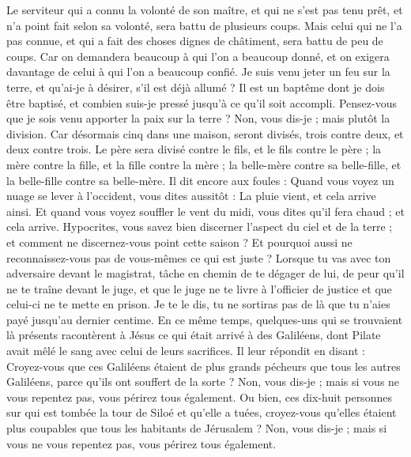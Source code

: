 \begin{multicols}{2}
Le serviteur qui a connu la volonté de son maître, et qui ne s'est pas tenu prêt, et n'a point fait selon sa volonté, sera battu de plusieurs coups.
Mais celui qui ne l'a pas connue, et qui a fait des choses dignes de châtiment, sera battu de peu de coups. Car on demandera beaucoup à qui l’on a beaucoup donné, et on exigera davantage de celui à qui l’on a beaucoup confié.
Je suis venu jeter un feu sur la terre, et qu’ai-je à désirer, s'il est déjà allumé ?
Il est un baptême dont je dois être baptisé, et combien suis-je pressé jusqu'à ce qu'il soit accompli.
Pensez-vous que je sois venu apporter la paix sur la terre ? Non, vous dis-je ; mais plutôt la division.
Car désormais cinq dans une maison, seront divisés, trois contre deux, et deux contre trois.
Le père sera divisé contre le fils, et le fils contre le père ; la mère contre la fille, et la fille contre la mère ; la belle-mère contre sa belle-fille, et la belle-fille contre sa belle-mère.
Il dit encore aux foules : Quand vous voyez un nuage se lever à l'occident, vous dites aussitôt : La pluie vient, et cela arrive ainsi.
Et quand vous voyez souffler le vent du midi, vous dites qu'il fera chaud ; et cela arrive.
Hypocrites, vous savez bien discerner l’aspect du ciel et de la terre ; et comment ne discernez-vous point cette saison ?
Et pourquoi aussi ne reconnaissez-vous pas de vous-mêmes ce qui est juste ?
Lorsque tu vas avec ton adversaire devant le magistrat, tâche en chemin de te dégager de lui, de peur qu’il ne te traîne devant le juge, et que le juge ne te livre à l’officier de justice et que celui-ci ne te mette en prison.
Je te le dis, tu ne sortiras pas de là que tu n’aies payé jusqu’au dernier centime.
\VerseOne{}En ce même temps, quelques-uns qui se trouvaient là présents racontèrent à Jésus ce qui était arrivé à des Galiléens, dont Pilate avait mêlé le sang avec celui de leurs sacrifices.
Il leur répondit en disant : Croyez-vous que ces Galiléens étaient de plus grands pécheurs que tous les autres Galiléens, parce qu'ils ont souffert de la sorte ?
Non, vous dis-je ; mais si vous ne vous repentez pas, vous périrez tous également.
Ou bien, ces dix-huit personnes sur qui est tombée la tour de Siloé et qu’elle a tuées, croyez-vous qu’elles étaient plus coupables que tous les habitants de Jérusalem ?
Non, vous dis-je ; mais si vous ne vous repentez pas, vous périrez tous également.

\end{multicols}
